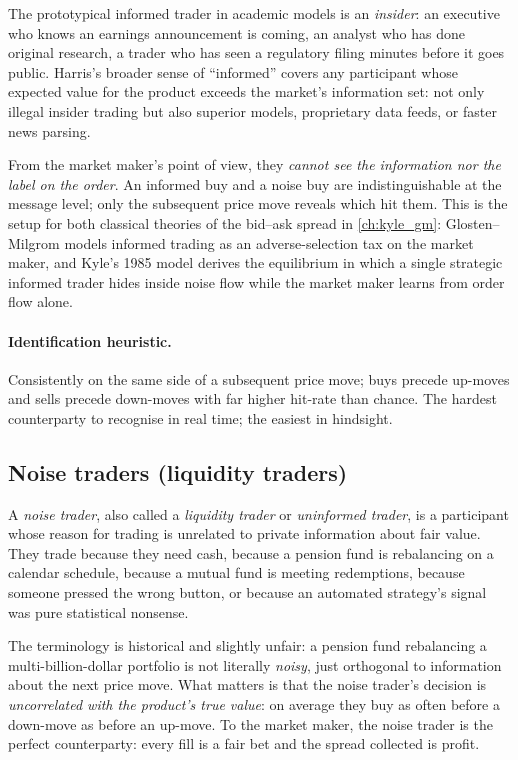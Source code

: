 The prototypical informed trader in academic models is an
\emph{insider}: an executive who knows an earnings announcement is
coming, an analyst who has done original research, a trader who has
seen a regulatory filing minutes before it goes public. Harris's
broader sense of ``informed'' covers any participant whose expected
value for the product exceeds the market's information set: not
only illegal insider trading but also superior models, proprietary
data feeds, or faster news parsing.

From the market maker's point of view, they \emph{cannot see the
information nor the label on the order}. An informed buy and a noise
buy are indistinguishable at the message level; only the subsequent
price move reveals which hit them. This is the setup for both
classical theories of the bid--ask spread in \cref{ch:kyle_gm}:
Glosten--Milgrom models informed trading as an adverse-selection tax
on the market maker, and Kyle's 1985 model derives the equilibrium in
which a single strategic informed trader hides inside noise flow while
the market maker learns from order flow alone.

\paragraph{Identification heuristic.} Consistently on the same side of
a subsequent price move; buys precede up-moves and sells precede
down-moves with far higher hit-rate than chance. The hardest
counterparty to recognise in real time; the easiest in hindsight.

\subsection{Noise traders (liquidity traders)}
\label{subsec:noise}

\begin{definition}
A \emph{noise trader}, also called a \emph{liquidity trader} or
\emph{uninformed trader}, is a participant whose reason for trading is
unrelated to private information about fair value. They trade because
they need cash, because a pension fund is rebalancing on a calendar
schedule, because a mutual fund is meeting redemptions, because
someone pressed the wrong button, or because an automated strategy's
signal was pure statistical nonsense.
\end{definition}

The terminology is historical and slightly unfair: a pension fund
rebalancing a multi-billion-dollar portfolio is not literally
\emph{noisy}, just orthogonal to information about the next price
move. What matters is that the noise trader's decision is
\emph{uncorrelated with the product's true value}: on average they
buy as often before a down-move as before an up-move. To the market
maker, the noise trader is the perfect counterparty: every fill is
a fair bet and the spread collected is profit.

